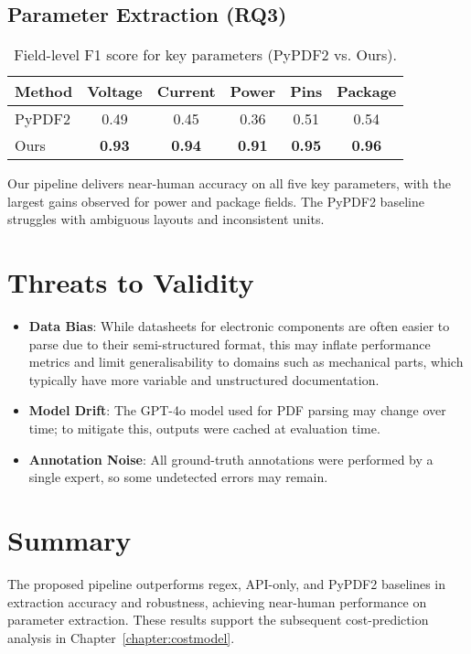 \subsection{Parameter Extraction (RQ3)}
\begin{table}[H]
\centering
\caption{Field-level F1 score for key parameters (PyPDF2 vs. Ours).}
\label{tab:fields}
\begin{tabular}{lccccc}
\toprule
Method & Voltage & Current & Power & Pins & Package \\
\midrule
PyPDF2    & 0.49 & 0.45 & 0.36 & 0.51 & 0.54 \\
Ours      & \textbf{0.93} & \textbf{0.94} & \textbf{0.91} & \textbf{0.95} & \textbf{0.96} \\
\bottomrule
\end{tabular}
\end{table}
Our pipeline delivers near-human accuracy on all five key parameters, with the largest gains observed for power and package fields. The PyPDF2 baseline struggles with ambiguous layouts and inconsistent units.

\section{Threats to Validity}
\begin{itemize}
  \item \textbf{Data Bias}: While datasheets for electronic components are often easier to parse due to their semi-structured format, this may inflate performance metrics and limit generalisability to domains such as mechanical parts, which typically have more variable and unstructured documentation.
  \item \textbf{Model Drift}: The GPT-4o model used for PDF parsing may change over time; to mitigate this, outputs were cached at evaluation time.
  \item \textbf{Annotation Noise}: All ground-truth annotations were performed by a single expert, so some undetected errors may remain.
\end{itemize}

\section{Summary}
The proposed pipeline outperforms regex, API-only, and PyPDF2 baselines in extraction accuracy and robustness, achieving near-human performance on parameter extraction. These results support the subsequent cost-prediction analysis in Chapter~\ref{chapter:costmodel}.